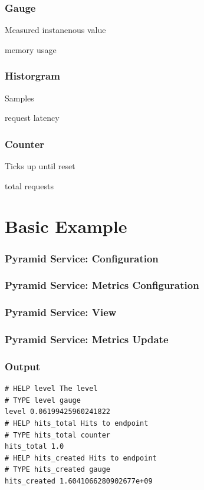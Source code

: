 \begin{frame}
\frametitle{Gauge}

Measured instanenous value\pause

memory usage

\end{frame}

\begin{frame}
\frametitle{Historgram}

Samples\pause

request latency

\end{frame}

\begin{frame}
\frametitle{Counter}

Ticks up until reset\pause

total requests

\end{frame}

\section{Basic Example}

\begin{frame}[fragile]
\frametitle{Pyramid Service: Configuration}

\end{frame}

\begin{frame}[fragile]
\frametitle{Pyramid Service: Metrics Configuration}

\end{frame}

\begin{frame}[fragile]
\frametitle{Pyramid Service: View}

\end{frame}

\begin{frame}[fragile]
\frametitle{Pyramid Service: Metrics Update}

\end{frame}

\begin{frame}[fragile]
\frametitle{Output}
\begin{lstlisting}
# HELP level The level
# TYPE level gauge
level 0.06199425960241822
# HELP hits_total Hits to endpoint
# TYPE hits_total counter
hits_total 1.0
# HELP hits_created Hits to endpoint
# TYPE hits_created gauge
hits_created 1.6041066280902677e+09
\end{lstlisting}
\end{frame}

